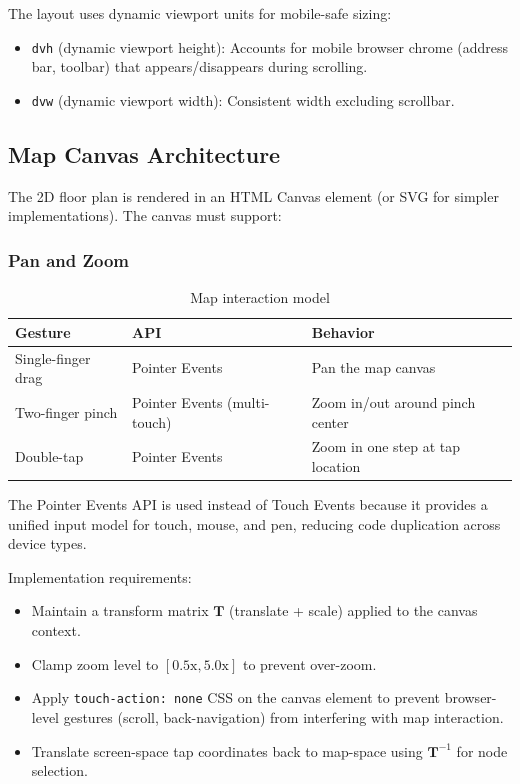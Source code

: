 The layout uses dynamic viewport units for mobile-safe sizing:
\begin{itemize}
  \item \texttt{dvh} (dynamic viewport height): Accounts for mobile browser chrome (address bar, toolbar) that appears/disappears during scrolling.
  \item \texttt{dvw} (dynamic viewport width): Consistent width excluding scrollbar.
\end{itemize}

\subsection{Map Canvas Architecture}

The 2D floor plan is rendered in an HTML Canvas element (or SVG for simpler implementations). The canvas must support:

\subsubsection{Pan and Zoom}

\begin{table}[H]
\centering
\caption{Map interaction model}
\begin{tabularx}{0.9\textwidth}{llX}
\toprule
\textbf{Gesture} & \textbf{API} & \textbf{Behavior} \\
\midrule
Single-finger drag & Pointer Events \cite{W3CPointerEvents2019} & Pan the map canvas \\
Two-finger pinch & Pointer Events (multi-touch) & Zoom in/out around pinch center \\
Double-tap & Pointer Events & Zoom in one step at tap location \\
\bottomrule
\end{tabularx}
\end{table}

The Pointer Events API \cite{W3CPointerEvents2019} is used instead of Touch Events because it provides a unified input model for touch, mouse, and pen, reducing code duplication across device types.

Implementation requirements:
\begin{itemize}
  \item Maintain a transform matrix $\mathbf{T}$ (translate + scale) applied to the canvas context.
  \item Clamp zoom level to $[\text{0.5x}, \text{5.0x}]$ to prevent over-zoom.
  \item Apply \texttt{touch-action: none} CSS on the canvas element to prevent browser-level gestures (scroll, back-navigation) from interfering with map interaction.
  \item Translate screen-space tap coordinates back to map-space using $\mathbf{T}^{-1}$ for node selection.
\end{itemize}

